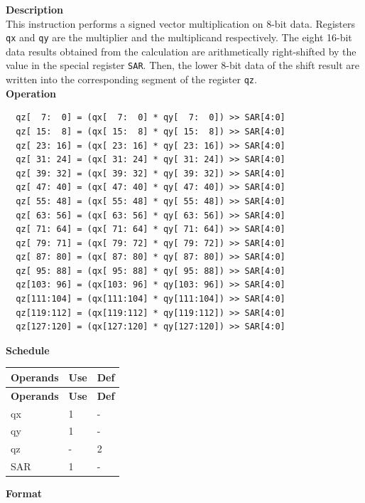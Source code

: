 \textbf{Description}\\
This instruction performs a signed vector multiplication on 8-bit data. Registers \lstinline{qx} and \lstinline{qy} are the multiplier and the multiplicand respectively. The eight 16-bit data results obtained from the calculation are arithmetically right-shifted by the value in the special register \lstinline{SAR}. Then, the lower 8-bit data of the shift result are written into the corresponding segment of the register \lstinline{qz}.\\
\textbf{Operation}
\begin{lstlisting}
  qz[  7:  0] = (qx[  7:  0] * qy[  7:  0]) >> SAR[4:0]
  qz[ 15:  8] = (qx[ 15:  8] * qy[ 15:  8]) >> SAR[4:0]
  qz[ 23: 16] = (qx[ 23: 16] * qy[ 23: 16]) >> SAR[4:0]
  qz[ 31: 24] = (qx[ 31: 24] * qy[ 31: 24]) >> SAR[4:0]
  qz[ 39: 32] = (qx[ 39: 32] * qy[ 39: 32]) >> SAR[4:0]
  qz[ 47: 40] = (qx[ 47: 40] * qy[ 47: 40]) >> SAR[4:0]
  qz[ 55: 48] = (qx[ 55: 48] * qy[ 55: 48]) >> SAR[4:0]
  qz[ 63: 56] = (qx[ 63: 56] * qy[ 63: 56]) >> SAR[4:0]
  qz[ 71: 64] = (qx[ 71: 64] * qy[ 71: 64]) >> SAR[4:0]
  qz[ 79: 71] = (qx[ 79: 72] * qy[ 79: 72]) >> SAR[4:0]
  qz[ 87: 80] = (qx[ 87: 80] * qy[ 87: 80]) >> SAR[4:0]
  qz[ 95: 88] = (qx[ 95: 88] * qy[ 95: 88]) >> SAR[4:0]
  qz[103: 96] = (qx[103: 96] * qy[103: 96]) >> SAR[4:0]
  qz[111:104] = (qx[111:104] * qy[111:104]) >> SAR[4:0]
  qz[119:112] = (qx[119:112] * qy[119:112]) >> SAR[4:0]
  qz[127:120] = (qx[127:120] * qy[127:120]) >> SAR[4:0]

\end{lstlisting}


\textbf{Schedule}\\
\begin{longtable}[c]{|l|l|l|}
    \hline
    \rowcolor{lightgray}
    \textbf{Operands} & \textbf{Use} & \textbf{Def} \\\hline
    \endfirsthead
    \hline
    \rowcolor{lightgray}
     \textbf{Operands} & \textbf{Use} & \textbf{Def} \\\hline
    \endhead
    \hline
    \endfoot

    qx & 1 & - \\\hline
  qy & 1 & - \\\hline
     qz & - & 2 \\\hline
    SAR & 1 & -

\end{longtable}

\textbf{Format}\\

